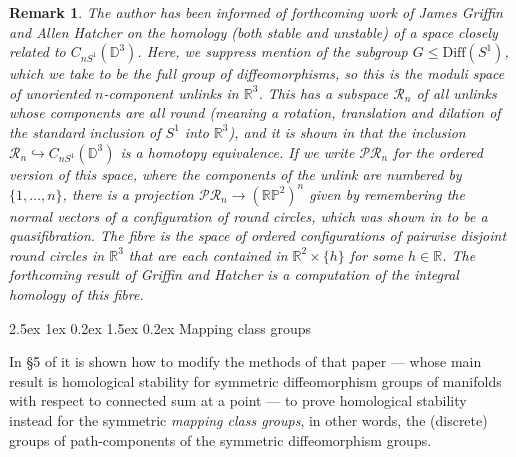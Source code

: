 \documentclass[reqno,a4paper]{article}
\makeatletter
\numberwithin{equation}{section}
\theoremstyle{italicised}
\theoremstyle{upright}
\newtheorem{rmk}[thm]{Remark}
\theoremstyle{italicised-restate}
\renewcommand*{\subsection}{\@startsection{subsection}{2}{\z@}%
	{2.5ex \@plus 1ex \@minus 0.2ex}%
	{1.5ex \@plus 0.2ex}%
	{\normalfont\normalsize\bfseries}}
\newcommand{\cP}{\mathcal{P}}
\newcommand{\cR}{\mathcal{R}}
\newcommand{\bD}{\mathbb{D}}
\newcommand{\bP}{\mathbb{P}}
\newcommand{\bR}{\mathbb{R}}
\renewcommand{\leq}{\leqslant}
\makeatother
\begin{document}
\begin{rmk}
\label{rmk:GriffinHatcher}
The author has been informed of forthcoming work of James Griffin and Allen Hatcher on the homology (both stable and unstable) of a space closely related to $C_{nS^1}(\bD^3)$. Here, we suppress mention of the subgroup $G \leq \mathrm{Diff}(S^1)$, which we take to be the full group of diffeomorphisms, so this is the moduli space of unoriented $n$-component unlinks in $\bR^3$. This has a subspace $\cR_n$ of all unlinks whose components are all \emph{round} (meaning a rotation, translation and dilation of the standard inclusion of $S^1$ into $\bR^3$), and it is shown in \cite{BrendleHatcher2013Configurationspacesrings} that the inclusion $\cR_n \hookrightarrow C_{nS^1}(\bD^3)$ is a homotopy equivalence. If we write $\cP\cR_n$ for the ordered version of this space, where the components of the unlink are numbered by $\{1,\ldots,n\}$, there is a projection $\cP\cR_n \to (\bR\bP^2)^n$ given by remembering the normal vectors of a configuration of round circles, which was shown in \cite{BrendleHatcher2013Configurationspacesrings} to be a quasifibration. The fibre is the space of ordered configurations of pairwise disjoint round circles in $\bR^3$ that are each contained in $\bR^2 \times \{h\}$ for some $h \in \bR$. The forthcoming result of Griffin and Hatcher is a computation of the integral homology of this fibre.
\end{rmk}


\subsection{Mapping class groups}
\label{ss:mcg}


In \S 5 of \cite{Tillmann2016Homologystabilitysymmetric} it is shown how to modify the methods of that paper --- whose main result is homological stability for symmetric diffeomorphism groups of manifolds with respect to connected sum at a point --- to prove homological stability instead for the symmetric \emph{mapping class groups}, in other words, the (discrete) groups of path-components of the symmetric diffeomorphism groups.
\end{document}
